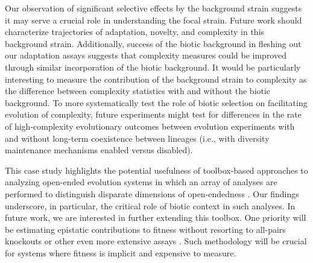 Our observation of significant selective effects by the background strain suggests it may serve a crucial role in understanding the focal strain.
Future work should characterize trajectories of adaptation, novelty, and complexity in this background strain.
Additionally, success of the biotic background in fleshing out our adaptation assays suggests that complexity measures could be improved through similar incorporation of the biotic background.
It would be particularly interesting to measure the contribution of the background strain to complexity as the difference between complexity statistics with and without the biotic background.
To more systematically test the role of biotic selection on facilitating evolution of complexity, future experiments might test for differences in the rate of high-complexity evolutionary outcomes between evolution experiments with and without long-term coexistence between lineages (i.e., with diversity maintenance mechanisms enabled versus disabled).

This case study highlights the potential usefulness of toolbox-based approaches to analyzing open-ended evolution systems in which an array of analyses are performed to distinguish disparate dimensions of open-endedness \citep{dolson2019modes}.
Our findings underscore, in particular, the critical role of biotic context in such analyses.
In future work, we are interested in further extending this toolbox.
One priority will be estimating epistatic contributions to fitness without resorting to all-pairs knockouts or other even more extensive assays \citep{moreno2024methods}.
Such methodology will be crucial for systems where fitness is implicit and expensive to measure.









